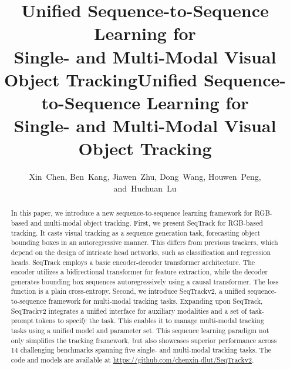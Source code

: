 \title{Unified Sequence-to-Sequence Learning for \\
Single- and Multi-Modal Visual Object Tracking}



\title{Unified Sequence-to-Sequence Learning for \\
Single- and Multi-Modal Visual Object Tracking}

\author{Xin~Chen,
        Ben~Kang,
        Jiawen~Zhu,
        Dong~Wang,
        Houwen~Peng,
        and~Huchuan~Lu
        }
        

\maketitle

\begin{abstract}
In this paper, we introduce a new sequence-to-sequence learning framework for RGB-based and multi-modal object tracking. First, we present SeqTrack for RGB-based tracking. It casts visual tracking as a sequence generation task, forecasting object bounding boxes in an autoregressive manner. This differs from previous trackers, which depend on the design of intricate head networks, such as classification and regression heads. SeqTrack employs a basic encoder-decoder transformer architecture. The encoder utilizes a bidirectional transformer for feature extraction, while the decoder generates bounding box sequences autoregressively using a causal transformer. The loss function is a plain cross-entropy.
Second, we introduce SeqTrackv2, a unified sequence-to-sequence framework for multi-modal tracking tasks. Expanding upon SeqTrack, SeqTrackv2 integrates a unified interface for auxiliary modalities and a set of task-prompt tokens to specify the task. This enables it to manage multi-modal tracking tasks using a unified model and parameter set. This sequence learning paradigm not only simplifies the tracking framework, but also showcases superior performance across 14 challenging benchmarks spanning five single- and multi-modal tracking tasks. 
The code and models are available at  \href{https://github.com/chenxin-dlut/SeqTrackv2}{https://github.com/chenxin-dlut/SeqTrackv2}.
\end{abstract}

